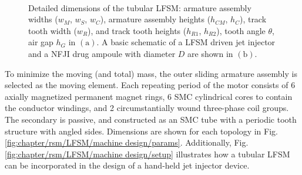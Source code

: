         
        \begin{figure}
            \centering
            \\
            \caption{ 
                \label{fig:chapter/rsm/LFSM/machine design}Detailed dimensions of the tubular LFSM: 
                armature assembly widths ($w_M$, $w_S$, $w_C$),
                armature assembly heights ($h_{CM}$, $h_{C}$),
                track tooth width ($w_{R}$),
                and track tooth heights ($h_{R1}$, $h_{R2}$), tooth angle $\theta$, air gap $h_G$ in $\mathrm{(a)}$. A basic schematic of a LFSM driven jet injector and a NFJI drug ampoule with diameter $D$ are shown in $\mathrm{(b)}$.
            }
        \end{figure}
        
        
        To minimize the moving (and total) mass, the outer sliding armature assembly is selected as the moving element. Each repeating period of the motor consists of 6 axially magnetized permanent magnet rings, 6 \acf{SMC} cylindrical cores to contain the conductor windings, and 2 circumstantially wound three-phase coil groups. The secondary is passive, and constructed as an SMC tube with a periodic tooth structure with angled sides. Dimensions are shown for each topology in Fig.\,\ref{fig:chapter/rsm/LFSM/machine design/params}. Additionally, Fig.\,\ref{fig:chapter/rsm/LFSM/machine design/setup} illustrates how a tubular \acs{LFSM} can be incorporated in the design of a hand-held jet injector device.
        
